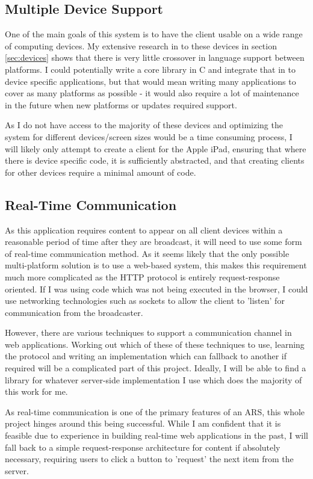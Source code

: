 \documentclass[a4papert,11pt,notitlepage]{ltxdoc}
\begin{document}
\subsection{Multiple Device Support}
One of the main goals of this system is to have the client usable on a wide range of computing devices. My extensive research in to these devices in section \ref{sec:devices} shows that there is very little crossover in language support between platforms. I could potentially write a core library in C and integrate that in to device specific applications, but that would mean writing many applications to cover as many platforms as possible - it would also require a lot of maintenance in the future when new platforms or updates required support.

As I do not have access to the majority of these devices and optimizing the system for different devices/screen sizes would be a time consuming process, I will likely only attempt to create a client for the Apple iPad, ensuring that where there is device specific code, it is sufficiently abstracted, and that creating clients for other devices require a minimal amount of code.

\subsection{Real-Time Communication}
As this application requires content to appear on all client devices within a reasonable period of time after they are broadcast, it will need to use some form of real-time communication method. As it seems likely that the only possible multi-platform solution is to use a web-based system, this makes this requirement much more complicated as the HTTP protocol is entirely request-response oriented. If I was using code which was not being executed in the browser, I could use networking technologies such as sockets to allow the client to 'listen' for communication from the broadcaster.

However, there are various techniques to support a  communication channel in web applications. Working out which of these of these techniques to use, learning the protocol and writing an implementation which can fallback to another if required will be a complicated part of this project. Ideally, I will be able to find a library for whatever server-side implementation I use which does the majority of this work for me.

As real-time communication is one of the primary features of an ARS, this whole project hinges around this being successful. While I am confident that it is feasible due to experience in building real-time web applications in the past, I will fall back to a simple request-response architecture for content if absolutely necessary, requiring users to click a button to 'request' the next item from the server.
\end{document}
